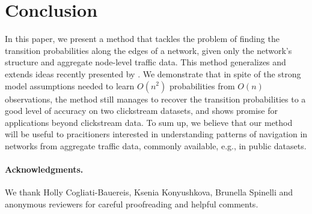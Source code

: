 \section{Conclusion}  %
\label{sec:conclusion}

In this paper, we present a method that tackles the problem of finding the transition probabilities along the edges of a network, given only the network's structure and aggregate node-level traffic data.
This method generalizes and extends ideas recently presented by \citet{kumar2015inverting}.
We demonstrate that in spite of the strong model assumptions needed to learn $O(n^2)$ probabilities from $O(n)$ observations, the method still manages to recover the transition probabilities to a good level of accuracy on two clickstream datasets, and shows promise for applications beyond clickstream data.
To sum up, we believe that our method will be useful to pracitioners interested in understanding patterns of navigation in networks from aggregate traffic data, commonly available, e.g., in public datasets.

\paragraph{Acknowledgments.}
We thank Holly Cogliati-Bauereis, Ksenia Konyushkova, Brunella Spinelli and anonymous reviewers for careful proofreading and helpful comments.

